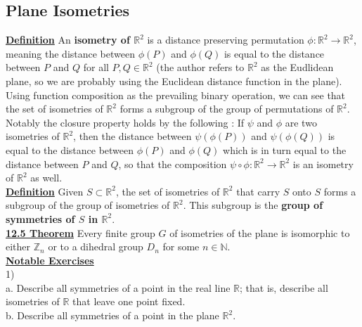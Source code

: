 \documentclass[12pt, letterpaper]{article}
\begin{document}
\subsection{Plane Isometries}

\noindent \underline{\bf Definition} An {\bf isometry of $\mathbb{R}^2$} is a distance preserving permutation $\phi : \mathbb{R}^2 \rightarrow \mathbb{R}^2$, meaning the distance between $\phi(P)$ and $\phi(Q)$ is equal to the distance between $P$ and $Q$ for all $P,Q \in \mathbb{R}^2$ (the author refers to $\mathbb{R}^2$ as the Eudlidean plane, so we are probably using the Euclidean distance function in the plane). \\

Using function composition as the prevailing binary operation, we can see that the set of isometries of $\mathbb{R}^2$ forms a subgroup of the group of permutations of $\mathbb{R}^2$. Notably the closure property holds by the following : If $\psi$ and $\phi$ are two isometries of $\mathbb{R}^2$, then the distance between $\psi(\phi(P))$ and $\psi(\phi(Q))$ is equal to the distance between $\phi(P)$ and $\phi(Q)$ which is in turn equal to the distance between $P$ and $Q$, so that the composition $\psi \circ \phi : \mathbb{R}^2 \rightarrow \mathbb{R}^2$ is an isometry of $\mathbb{R}^2$ as well. \\

\noindent \underline{\bf Definition} Given $S \subset \mathbb{R}^2$, the set of isometries of $\mathbb{R}^2$ that carry $S$ onto $S$ forms a subgroup of the group of isometries of $\mathbb{R}^2$. This subgroup is the {\bf group of symmetries of $S$ in $\mathbb{R}^2$}. \\

\noindent \underline{\bf 12.5 Theorem} Every finite group $G$ of isometries of the plane is isomorphic to either $\mathbb{Z}_n$ or to a dihedral group $D_n$ for some $n \in \mathbb{N}$. \\

\noindent \underline{\bf Notable Exercises} \\

1)\\

a. Describe all symmetries of a point in the real line $\mathbb{R}$; that is, describe all isometries of $\mathbb{R}$ that leave one point fixed. \\

b. Describe all symmetries of a point in the plane $\mathbb{R}^2$. \\
\end{document}
